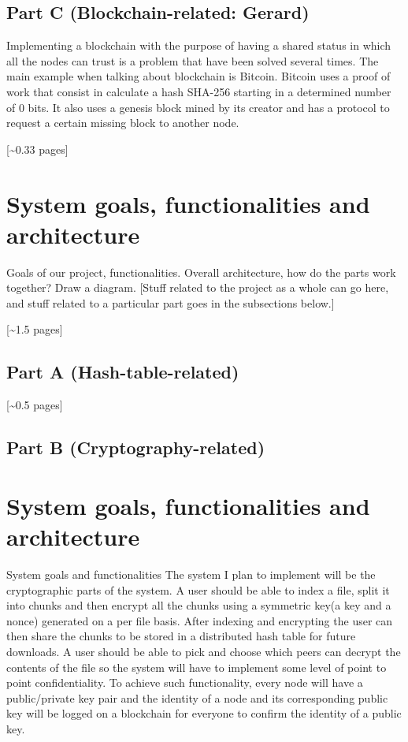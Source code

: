 \documentclass[12pt,a4paper,draft]{article}
\begin{document}
\subsection{Part C (Blockchain-related: Gerard)}

Implementing a blockchain with the purpose of having a shared status in which all the nodes can trust is a problem that have been solved several times. The main example when talking about blockchain is Bitcoin. Bitcoin uses a proof of work that consist in calculate a hash SHA-256 starting in a determined number of 0 bits. It also uses a genesis block mined by its creator and has a protocol to request a certain missing block to another node.

[\textasciitilde{}0.33 pages]

\section{System goals, functionalities and architecture}

Goals of our project, functionalities.
Overall architecture, how do the parts work together?
Draw a diagram.
[Stuff related to the project as a whole can go here, and stuff related to a particular part goes in the subsections below.]

[\textasciitilde{}1.5 pages]

\subsection{Part A (Hash-table-related)}

[\textasciitilde{}0.5 pages]

\subsection{Part B (Cryptography-related)}

\section{System goals, functionalities and architecture}

System goals and functionalities
The system I plan to implement will be the cryptographic parts of the system. A user should be able to index a file, split it into chunks and then encrypt all the chunks using a symmetric key(a key and a nonce) generated on a per file basis. After indexing and encrypting the user can then share the chunks to be stored in a distributed hash table for future downloads. A user should be able to pick and choose which peers can decrypt the contents of the file so the system will have to implement some level of point to point confidentiality. To achieve such functionality, every node will have a public/private key pair and the identity of a node and its corresponding public key will be logged on a blockchain for everyone to confirm the identity of a public key.  
\end{document}
